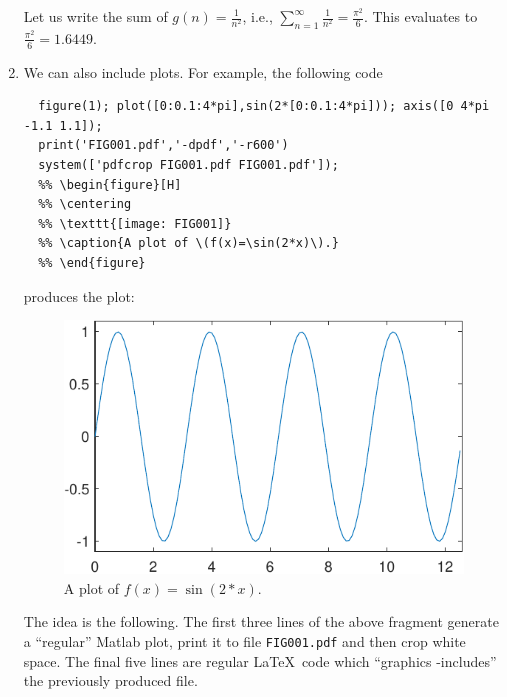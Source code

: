 \documentclass{article}
\begin{document}
\begin{enumerate}
  \qquad Let us write the sum of \(g(n)=\frac{1}{n^2}\), i.e.,  
  \(\sum_{n=1}^\infty \frac{1}{n^2}  = \frac{\pi ^2}{6}\).  
  This evaluates to \( \frac{\pi ^2}{6} = 1.6449\). 
  \item We can also include plots. For example,  the following code 
  \begin{lstlisting} 
  figure(1); plot([0:0.1:4*pi],sin(2*[0:0.1:4*pi])); axis([0 4*pi -1.1 1.1]); 
  print('FIG001.pdf','-dpdf','-r600') 
  system(['pdfcrop FIG001.pdf FIG001.pdf']); 
  %% \begin{figure}[H] 
  %% \centering 
  %% \texttt{[image: FIG001]} 
  %% \caption{A plot of \(f(x)=\sin(2*x)\).} 
  %% \end{figure} 
  \end{lstlisting} 
  produces the plot: 
  \begin{figure}[H] 
  \centering 
  \includegraphics[scale=0.75]{FIG001.pdf} 
  \caption{A plot of \(f(x)=\sin(2*x)\).} 
  \end{figure} 
  The idea is the following. The first three lines of the above fragment  
  generate a ``regular'' \textsf{Matlab} plot, print it to file \texttt{FIG001.pdf} and then crop white space. 
  The final five lines are regular \LaTeX\ code which ``graphics -includes'' the previously produced file. 
   

\end{enumerate}
\end{document}
